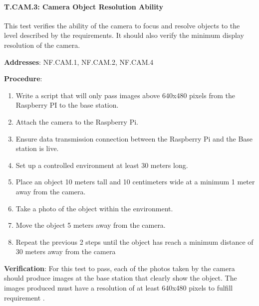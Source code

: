 %

\paragraph{T.CAM.3: Camera Object Resolution Ability}

This test verifies the ability of the camera to focus and resolve objects to the level described by the requirements. It should also verify the minimum display resolution of the camera.

\textbf{Addresses}:  NF.CAM.1, NF.CAM.2, NF.CAM.4

\textbf{Procedure}:
\begin{enumerate}[noitemsep]
    \item Write a script that will only pass images above 640x480 pixels from the Raspberry PI to the base station.
    \item Attach the camera to the Raspberry Pi.
    \item Ensure data transmission connection between the Raspberry Pi and the Base station is live.
    \item Set up a controlled environment at least 30 meters long.
    \item Place an object 10 meters tall and 10 centimeters wide at a minimum 1 meter away from the camera.
    \item Take a photo of the object within the environment.
    \item Move the object 5 meters away from the camera.
    \item Repeat the previous 2 steps until the object has reach a minimum distance of 30 meters away from the camera
\end{enumerate}

\textbf{Verification}: 
For this test to pass, each of the photos taken by the camera should produce images at the base station that clearly show the object. The images produced must have a resolution of at least 640x480 pixels to fulfill requirement .

%